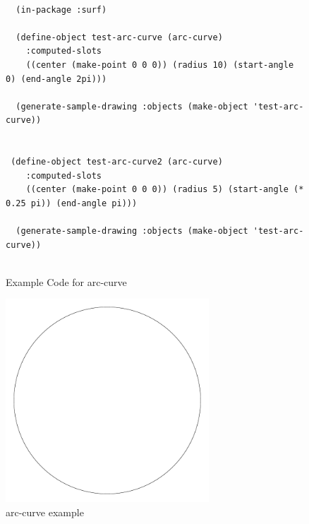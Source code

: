 \documentclass [11pt]{book}
\begin{document}
\begin{itemize}
\begin{figure}
\begin{lrbox}{\boxedverb}
\begin{minipage}{\linewidth}
{\small

\begin{verbatim}

  (in-package :surf)

  (define-object test-arc-curve (arc-curve)
    :computed-slots
    ((center (make-point 0 0 0)) (radius 10) (start-angle 0) (end-angle 2pi)))

  (generate-sample-drawing :objects (make-object 'test-arc-curve))


 (define-object test-arc-curve2 (arc-curve)
    :computed-slots
    ((center (make-point 0 0 0)) (radius 5) (start-angle (* 0.25 pi)) (end-angle pi)))
  
  (generate-sample-drawing :objects (make-object 'test-arc-curve))


\end{verbatim}}
\end{minipage}
\end{lrbox}
\fbox{\usebox{\boxedverb}}

\caption{Example Code for arc-curve}

\label{fig:example-code-arc-curve}

\end{figure}

\begin{figure}
\begin{center}
\includegraphics[width=3in,height=3in]{../images/example-arc-curve.pdf}
\end{center}

\caption{arc-curve example}

\label{fig:arc-curve}


\end{figure}
\end{itemize}
\end{document}
